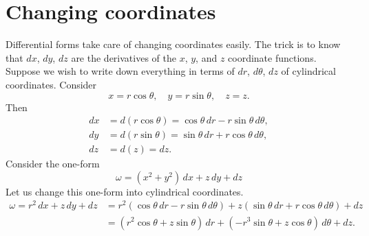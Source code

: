 \documentclass[12pt]{article}
\begin{document}
%
%

\section*{Changing coordinates}

Differential forms take care of changing coordinates easily.  The trick is
to know that $dx$, $dy$, $dz$ are the derivatives of the $x$, $y$, and $z$ coordinate
functions.  Suppose we wish to write down everything in terms of $dr$, $d\theta$, $dz$ of cylindrical coordinates.
Consider
\[
x = r \cos \theta, \quad y = r \sin \theta, \quad z = z .
\]
Then
\begin{align*}
dx & = d(r \cos \theta) = \cos \theta \, dr - r \sin \theta \, d \theta , \\
dy & = d(r \sin \theta) = \sin \theta \, dr + r \cos \theta \, d \theta , \\
dz & = d(z) = dz .
\end{align*}
Consider the one-form
\[
\omega = (x^2+y^2) \, dx + z \, dy + dz
\]
Let us change this one-form into cylindrical coordinates.
\begin{equation*}
\begin{split}
\omega = 
r^2 \, dx + z \, dy + dz
& =
r^2 (\cos \theta \, dr - r \sin \theta \, d \theta)
+ z (\sin \theta \, dr + r \cos \theta \, d \theta)
+ dz
\\
& =
( r^2 \cos \theta + z \sin \theta) \, dr
+ (- r^3 \sin \theta + z \cos \theta ) \, d\theta
+ dz .
\end{split}
\end{equation*}
\end{document}
